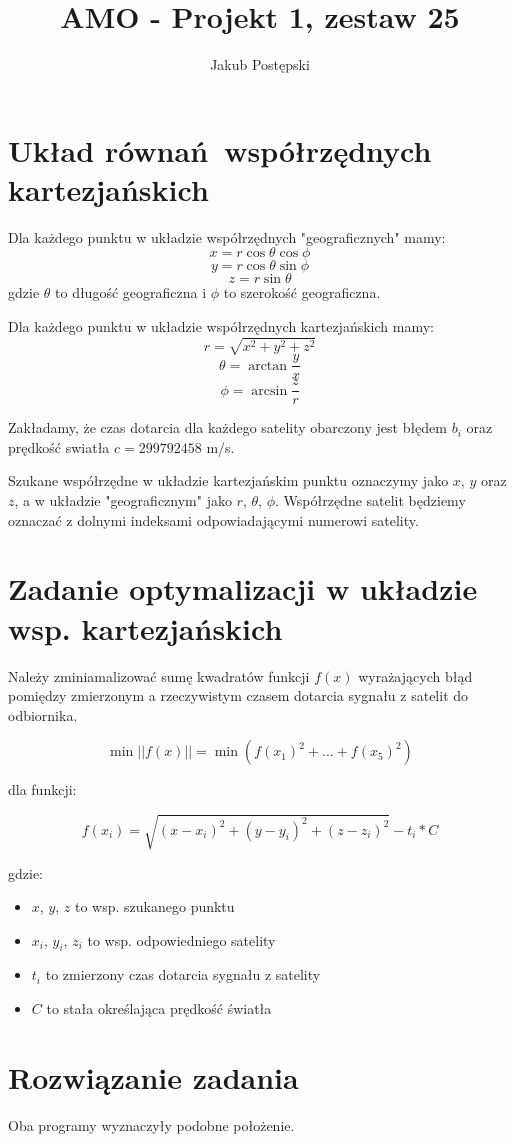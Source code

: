 \documentclass[]{article}
\title{AMO - Projekt 1, zestaw 25}
\author{Jakub Postępski}
\begin{document}
\maketitle


\section{Układ równań współrzędnych kartezjańskich}
Dla każdego punktu w układzie współrzędnych "geograficznych" mamy:
\[ x = r\cos \theta \cos \phi \]
\[ y = r\cos \theta \sin \phi \]
\[ z = r\sin \theta \]
gdzie $ \theta $ to długość geograficzna i $ \phi $ to szerokość geograficzna.

Dla każdego punktu w układzie współrzędnych kartezjańskich mamy:
\[ r = \sqrt{x^2 + y^2 + z^2}\]
\[ \theta = \arctan \frac{y}{x} \]
\[ \phi = \arcsin \frac{z}{r} \]

Zakładamy, że czas dotarcia dla każdego satelity obarczony jest błędem $b_i$ oraz prędkość swiatła $c=299792458$ m/s.

Szukane współrzędne w układzie kartezjańskim punktu oznaczymy jako $x$, $y$ oraz $z$, a w układzie "geograficznym" jako $r$, $\theta$, $\phi$. Współrzędne satelit będziemy oznaczać z dolnymi indeksami odpowiadającymi numerowi satelity.


\section{Zadanie optymalizacji w układzie wsp. kartezjańskich} 
Należy zminiamalizować sumę kwadratów funkcji $f(x)$ wyrażających błąd pomiędzy zmierzonym a rzeczywistym czasem dotarcia sygnału z satelit do odbiornika.

\[ \min || f(x) || = \min (f(x_1)^2 + ... + f(x_5)^2)\]

dla funkcji:

\[ f(x_i) = \sqrt{(x-x_i)^2 + (y-y_i)^2 + (z-z_i)^2}-t_i*C\]

gdzie: 
\begin{itemize}
	\item $x$, $y$, $z$ to wsp. szukanego punktu
	\item $x_i$, $y_i$, $z_i$ to wsp. odpowiedniego satelity
	\item $t_i$ to zmierzony czas dotarcia sygnału z satelity
	\item $C$ to stała określająca prędkość światła
\end{itemize}

\section{Rozwiązanie zadania}
Oba programy wyznaczyły podobne położenie.
\end{document}
